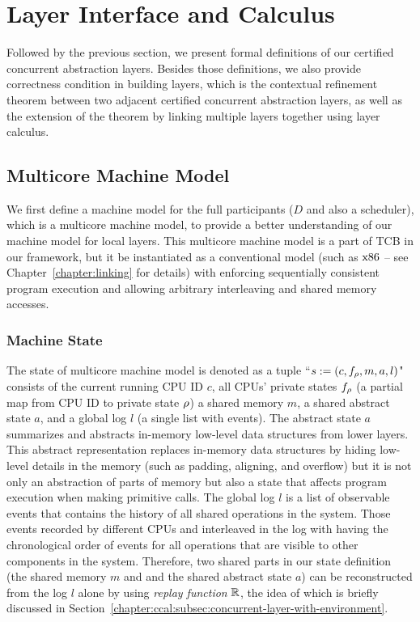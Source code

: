 \section{Layer Interface and Calculus}
\label{chapter:ccal:sec:interface-calculus}

Followed by the previous section, 
we present formal definitions of our certified concurrent abstraction layers.
Besides those definitions, 
we also provide correctness condition in building layers, which is 
the contextual refinement theorem between two adjacent certified concurrent abstraction layers,
as well as the extension of the theorem by linking multiple layers together using layer calculus.


\subsection{Multicore Machine Model}
\label{chapter:ccal:subsec:multicore-machine-model}


We first define a machine model for the full participants ($D$ and also a scheduler), which is a multicore machine model, 
to provide a better understanding of our machine model for local layers.
This multicore machine model is a part of TCB in our framework, but it be instantiated as a conventional model (such as $\mathrm{x86}$ -- see Chapter~\ref{chapter:linking} for  details) with enforcing sequentially consistent program
execution and allowing arbitrary interleaving
and shared memory accesses. 


\subsubsection{Machine State} 
The state of  multicore machine model is denoted as a tuple ``$s := (c, f_{\rho}, m, a, l)$"
consists of
 the current running CPU ID $c$,
all CPUs' private states $f_\rho$ (a partial map from CPU ID to  private state $\rho$)
 a shared memory $m$,
 a shared abstract state $a$,
and  a global log $l$ (a single list with events).
The abstract state $a$ 
summarizes and abstracts in-memory low-level data structures from lower layers. 
This abstract representation replaces
in-memory data structures by hiding low-level details in the memory (such as padding, aligning, and overflow)
but it is not only an abstraction of parts of memory but also a state that affects program execution when making primitive calls. 
The global log $l$ is a list of observable events that contains the history of all shared operations in the system.
Those events recorded by different CPUs and
interleaved in the log with having the chronological order of events for all operations that are visible to other components in the system. 
Therefore, 
two shared parts in our state definition (the shared memory $m$ and 
and the shared abstract state $a$)
can be reconstructed
from the log $l$ alone by using \emph{replay function} $\mathbb{R}$,
the idea of which is briefly discussed in Section~\ref{chapter:ccal:subsec:concurrent-layer-with-environment}.



